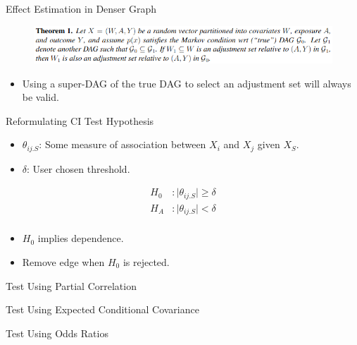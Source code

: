 \documentclass{beamer}
\begin{document}
\begin{frame}{Effect Estimation in Denser Graph}
	\begin{figure}
		\centering
		\includegraphics[scale=0.4]{imgs/theorem1.png}
	\end{figure}
	\begin{itemize}
		\item Using a super-DAG of the true DAG to select an adjustment set will always be valid.
	\end{itemize}
\end{frame}

\begin{frame}{Reformulating CI Test Hypothesis}
	\begin{itemize}
		\item $ \theta_{ij.S} $: Some measure of association between $ X_i $ and $ X_j $ given $ X_S $.
		\item $ \delta $: User chosen threshold.
	\end{itemize}

	\begin{equation*}
		\begin{split}
			H_0&: \rvert \theta_{ij.S} \rvert \ge \delta \\
			H_A&: \rvert \theta_{ij.S} \rvert < \delta \\
		\end{split}
	\end{equation*}

	\begin{itemize}
		\item $ H_0 $ implies dependence.
		\item Remove edge when $ H_0 $ is rejected.
	\end{itemize}
\end{frame}

\begin{frame}{Test Using Partial Correlation}
\end{frame}

\begin{frame}{Test Using Expected Conditional Covariance}
\end{frame}

\begin{frame}{Test Using Odds Ratios}
\end{frame}
\end{document}
